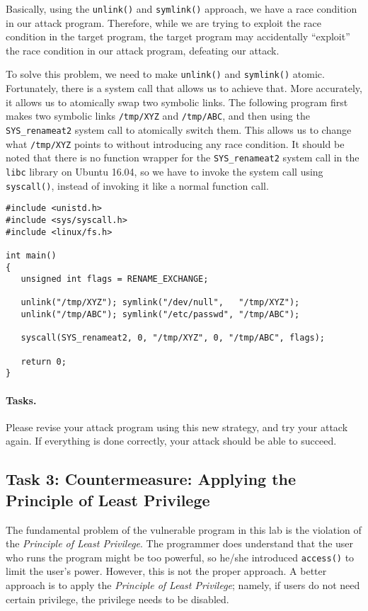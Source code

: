 Basically, using the \texttt{unlink()} and \texttt{symlink()} approach, 
we have a race condition in our attack program. Therefore, while we 
are trying to exploit the race condition in the target program,
the target program may accidentally ``exploit'' the race condition
in our attack program, defeating our attack.  


To solve this problem, we need to make 
\texttt{unlink()} and \texttt{symlink()} atomic. Fortunately, there 
is a system call that allows us to achieve that. More accurately,
it allows us to atomically swap two symbolic links. 
The following program first makes two symbolic links \texttt{/tmp/XYZ}
and \texttt{/tmp/ABC}, and then using the
\texttt{SYS\_renameat2} system call to atomically switch them. 
This allows us to change what \texttt{/tmp/XYZ} points to
without introducing any race condition. 
It should be noted that there is no function
wrapper for the \texttt{SYS\_renameat2} system call in the \texttt{libc} library
on Ubuntu 16.04, so we have to invoke the system call using 
\texttt{syscall()}, instead of invoking it like a normal function call. 


\begin{lstlisting}
#include <unistd.h>
#include <sys/syscall.h>
#include <linux/fs.h>

int main()
{
   unsigned int flags = RENAME_EXCHANGE;

   unlink("/tmp/XYZ"); symlink("/dev/null",   "/tmp/XYZ");
   unlink("/tmp/ABC"); symlink("/etc/passwd", "/tmp/ABC");

   syscall(SYS_renameat2, 0, "/tmp/XYZ", 0, "/tmp/ABC", flags);

   return 0;
}
\end{lstlisting}


\paragraph{Tasks.} Please revise your attack program using 
this new strategy, and try your attack again. If everything 
is done correctly, your attack should be able to succeed. 




\subsection{Task 3: Countermeasure: Applying the Principle of Least Privilege}

The fundamental problem of the vulnerable program in this lab is 
the violation of the {\em Principle of Least Privilege}. 
The programmer does understand that the user who runs the program 
might be too powerful, so he/she introduced {\tt access()} to limit the user's 
power. However, this is not the proper approach. A better
approach is to apply the {\em Principle of Least Privilege}; 
namely, if users do not need certain privilege, the privilege
needs to be disabled.

